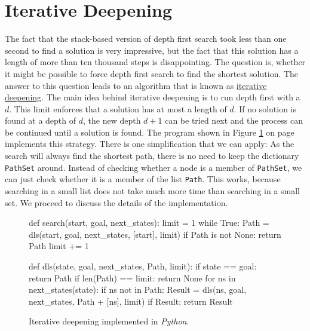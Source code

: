 \section{Iterative Deepening}
The fact that the stack-based version of depth first search took less than one second to find a solution is very
impressive, but the fact that this solution has a length of more than ten thousand steps is disappointing.
The question is, whether it might be possible to force depth first search to find the shortest
solution.  The answer to this question leads to an algorithm that is known as
\href{https://en.wikipedia.org/wiki/Iterative_deepening_depth-first_search}{iterative deepening}.
 The main idea behind iterative deepening is to run depth first with a  $d$.  This limit enforces that a solution has at most a length of $d$.  If no solution is found at a
depth of $d$, the new depth $d+1$ can be tried next and the process can be continued until a solution is found.
The program shown in Figure \ref{fig:Iterative-Deepening.ipynb} on page \pageref{fig:Iterative-Deepening.ipynb}
implements this strategy.
There is one simplification that we can apply: As the search will always find the shortest path, there is no
need to keep the dictionary \texttt{PathSet} around.  Instead of checking whether a node is a member of
\texttt{PathSet}, we can just check whether it is a member of the list \texttt{Path}.  This works, because
searching in a small list does not take much more time than searching in a small set.
We proceed to discuss the details of the implementation.

\begin{figure}[!ht]
\centering
\begin{python3code}
def search(start, goal, next_states):
    limit = 1
    while True:
        Path = dls(start, goal, next_states, [start], limit)
        if Path is not None:
            return Path
        limit += 1

def dls(state, goal, next_states, Path, limit):
    if state == goal:
        return Path
    if len(Path) == limit:
        return None
    for ns in next_states(state):
        if ns not in Path:
            Result = dls(ns, goal, next_states, Path + [ns], limit)
            if Result:
                return Result
\end{python3code}
\vspace*{-0.3cm}
\caption{Iterative deepening implemented in \textsl{Python}.}
\label{fig:Iterative-Deepening.ipynb}
\end{figure}

